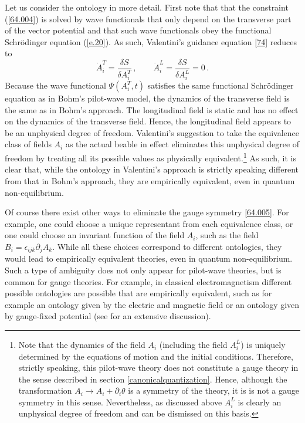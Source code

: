 \documentclass[12pt]{article}
\begin{document}
Let us consider the ontology in more detail. First note that that the constraint ({\ref{64.004}}) is solved by wave functionals that only depend on the transverse part of the vector potential and that such wave functionals obey the functional Schr{\"o}\-ding\-er equation ({\ref{e.20}}). As such, Valentini's guidance equation \eqref{74} reduces to 
\begin{equation}
{\dot A}^T_{i}  = \frac{\delta S}{\delta A^T_i } \,, \qquad {\dot A}^L_{i}  = \frac{\delta S}{\delta A^L_i } = 0 \,. 
\label{74.002} 
\end{equation}
Because the wave functional $\Psi( A^T_i,t)$ satisfies the same functional Schr{\"o}\-ding\-er equation as in Bohm's pilot-wave model, the dynamics of the transverse field is the same as in Bohm's approach. The longitudinal field is static and has no effect on the dynamics of the transverse field. Hence, the longitudinal field appears to be an unphysical degree of freedom. Valentini's suggestion to take the equivalence class of fields $A_i$ as the actual beable in effect eliminates this unphysical degree of freedom by treating all its possible values as physically equivalent.{\footnote{Note that the dynamics of the field $A_i$ (including the field $A^L_i$) is uniquely determined by the equations of motion and the initial conditions. Therefore, strictly speaking, this pilot-wave theory does not constitute a gauge theory in the sense described in section \ref{canonicalquantization}. Hence, although the transformation $A_i \to A_i + \partial_i \theta$ is a symmetry of the theory, it is is not a gauge symmetry in this sense. Nevertheless, as discussed above $A^L_i$ is clearly an unphysical degree of freedom and can be dismissed on this basis.}} As such, it is clear that, while the ontology in Valentini's approach is strictly speaking different from that in Bohm's approach, they are empirically equivalent, even in quantum non-equilibrium. 

Of course there exist other ways to eliminate the gauge symmetry \eqref{64.005}. For example, one could choose a unique representant from each equivalence class, or one could choose an invariant function of the field $A_i$, such as the field $B_i = \epsilon_{ijk} \partial_j A_k$. While all these choices correspond to different ontologies, they would lead to empirically equivalent theories, even in quantum non-equilibrium. Such a type of ambiguity does not only appear for pilot-wave theories, but is common for gauge theories. For example, in classical electromagnetism different possible ontologies are possible that are empirically equivalent, such as for example an ontology given by the electric and magnetic field or an ontology given by gauge-fixed potential (see \cite{healey07} for an extensive discussion). 
\end{document}
